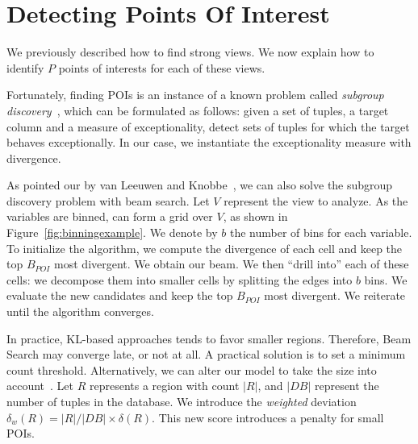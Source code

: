 \section{Detecting Points Of Interest}
\label{sec:detec}

We previously described how to find strong views. We now
explain how to identify $P$ points of interests for each of these views. 

Fortunately, finding POIs is an instance of a known problem called
\emph{subgroup discovery}~\cite{klosgen1996explora, wrobel1997algorithm}, which
can be formulated as follows: given a set of tuples, a target column and a
measure of exceptionality, detect sets of tuples for which the target behaves
exceptionally. In our case, we instantiate the exceptionality measure
with divergence. 

As pointed our by van Leeuwen and Knobbe~\cite{van2011non}, we can also solve
the subgroup discovery problem with beam search.  Let $V$ represent the view to
analyze. As the variables are binned, can form a grid over $V$, as shown in
Figure~\ref{fig:binningexample}. We denote by $b$ the number of bins for each
variable. To initialize the algorithm, we compute the divergence of each cell
and keep the top $B_{POI}$ most divergent. We obtain our beam. We then ``drill
into'' each of these cells: we decompose them into smaller cells by splitting
the edges into $b$ bins. We evaluate the new candidates and keep the top
$B_{POI}$ most divergent. We reiterate until the algorithm converges.

In practice, KL-based approaches tends to favor smaller regions. Therefore,
Beam Search may converge late, or not at all. A practical solution is to set a
minimum count threshold. Alternatively, we can alter our model to take the size
into account~\cite{van2011non}. Let $R$ represents a region with count $|R|$,
and $|DB|$ represent the number of tuples in the database. We introduce the
\emph{weighted} deviation $\delta_w(R) = |R|/|DB| \times \delta(R)$. This new
score introduces a penalty for small POIs.







